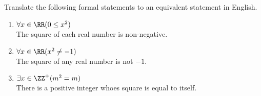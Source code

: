 \guard




\begin{exmp}
\label{exmp:translateQuantifiedStatements}
  Translate the following formal statements to an equivalent statement in English.
	\begin{enumerate}
		\item $\forall x \in \RR( 0 \leq x^2 ) $ \\
			The square of each real number is non-negative.
		\item $\forall x \in \RR ( x^2 \not= -1 ) $ \\
			The square of any real number is not $-1$.
		\item $\exists x\in\ZZ^+( m^2 = m ) $ \\
			There is a positive integer whoes square is equal to itself. 
	\end{enumerate}
\end{exmp}
